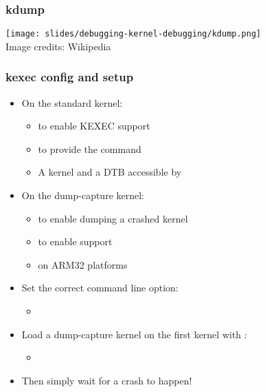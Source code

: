 \begin{frame}
  \frametitle{kdump}
  \center\texttt{[image: slides/debugging-kernel-debugging/kdump.png]}\\
  \tiny Image credits: Wikipedia
\end{frame}

\begin{frame}[fragile]
  \frametitle{kexec config and setup}
  \begin{itemize}
    \item On the standard kernel:
    \begin{itemize}
      \item {} to enable KEXEC support
      \item {} to provide the  command
      \item A kernel and a DTB accessible by 
    \end{itemize}
    \item On the dump-capture kernel:
    \begin{itemize}
      \item {} to enable dumping a crashed
            kernel
      \item {} to enable 
        support
      \item {} on ARM32 platforms
    \end{itemize}
    \item Set the correct  command line option:
    \begin{itemize}
      \item {}
    \end{itemize}
    \item Load a dump-capture kernel on the first kernel with :
    \begin{itemize}
      \item {}
    \end{itemize}
    \item Then simply wait for a crash to happen!
  \end{itemize}
\end{frame}

